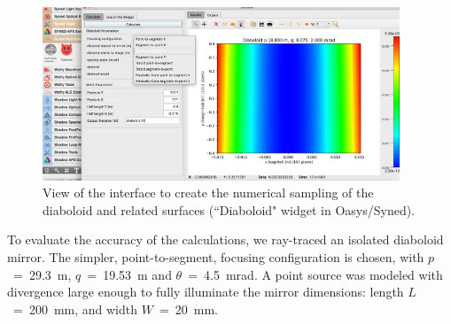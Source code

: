 \documentclass[preprint]{iucr}       %
\begin{document}
\begin{figure}\label{fig:widget}
\centering
\includegraphics[width=0.95\textwidth]{figures/widget.png}
\caption{View of the interface to create the numerical sampling of the diaboloid and related surfaces (``Diaboloid" widget in Oasys/Syned).}
\end{figure}

To evaluate the accuracy of the calculations, we ray-traced an isolated diaboloid mirror. The simpler, point-to-segment, focusing configuration is chosen, with $p$~=~\SI{29.3}{\meter}, $q$~=~\SI{19.53}{\meter} and $\theta$~=~\SI{4.5}{\milli\radian}. A point source was modeled with divergence large enough to fully illuminate the mirror dimensions: length $L$~=~\SI{200}{\milli\meter}, and width $W$~=~\SI{20}{\milli\meter}.
\end{document}
